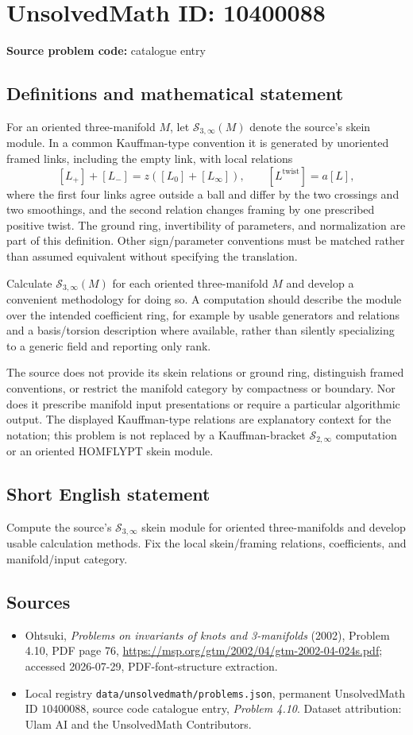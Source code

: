 \documentclass[11pt]{article}
\begin{document}
\section*{UnsolvedMath ID: 10400088}
\textbf{Source problem code:} catalogue entry
\subsection{Definitions and mathematical statement}
For an oriented three-manifold $M$, let $\mathcal S_{3,\infty}(M)$ denote the source's skein module. In a common Kauffman-type convention it is generated by unoriented framed links, including the empty link, with local relations
\[
[L_+]+[L_-]=z([L_0]+[L_\infty]),\qquad
[L^{\mathrm{twist}}]=a[L],
\]
where the first four links agree outside a ball and differ by the two crossings and two smoothings, and the second relation changes framing by one prescribed positive twist. The ground ring, invertibility of parameters, and normalization are part of this definition. Other sign/parameter conventions must be matched rather than assumed equivalent without specifying the translation.

Calculate $\mathcal S_{3,\infty}(M)$ for each oriented three-manifold $M$ and develop a convenient methodology for doing so. A computation should describe the module over the intended coefficient ring, for example by usable generators and relations and a basis/torsion description where available, rather than silently specializing to a generic field and reporting only rank.

The source does not provide its skein relations or ground ring, distinguish framed conventions, or restrict the manifold category by compactness or boundary. Nor does it prescribe manifold input presentations or require a particular algorithmic output. The displayed Kauffman-type relations are explanatory context for the notation; this problem is not replaced by a Kauffman-bracket $\mathcal S_{2,\infty}$ computation or an oriented HOMFLYPT skein module.
\subsection{Short English statement}
Compute the source's $\mathcal S_{3,\infty}$ skein module for oriented three-manifolds and develop usable calculation methods. Fix the local skein/framing relations, coefficients, and manifold/input category.
\subsection{Sources}
\begin{itemize}
\item Ohtsuki, \emph{Problems on invariants of knots and 3-manifolds} (2002), Problem 4.10, PDF page 76, \url{https://msp.org/gtm/2002/04/gtm-2002-04-024s.pdf}; accessed 2026-07-29, PDF-font-structure extraction.
\item Local registry \texttt{data/unsolvedmath/problems.json}, permanent UnsolvedMath ID $10400088$, source code catalogue entry, \emph{Problem 4.10}. Dataset attribution: Ulam AI and the UnsolvedMath Contributors.
\end{itemize}
\end{document}
